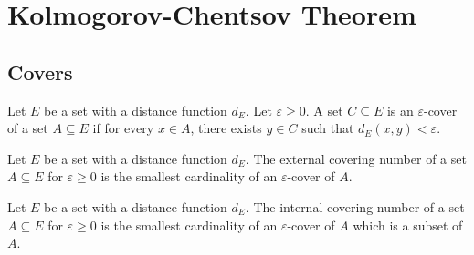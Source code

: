 \chapter{Kolmogorov-Chentsov Theorem}
\label{chap:kolmogorov_chentsov}

\section{Covers}

\begin{definition}\label{def:IsCover}
  \leanok
  Let $E$ be a set with a distance function $d_E$. Let $\varepsilon \ge 0$.
  A set $C \subseteq E$ is an $\varepsilon$-cover of a set $A \subseteq E$ if for every $x \in A$, there exists $y \in C$ such that $d_E(x, y) < \varepsilon$.
\end{definition}

\begin{definition}\label{def:externalCoveringNumber}
  \leanok
  Let $E$ be a set with a distance function $d_E$.
  The external covering number of a set $A \subseteq E$ for $\varepsilon \ge 0$ is the smallest cardinality of an $\varepsilon$-cover of $A$.
\end{definition}

\begin{definition}\label{def:internalCoveringNumber}
  \leanok
  Let $E$ be a set with a distance function $d_E$.
  The internal covering number of a set $A \subseteq E$ for $\varepsilon \ge 0$ is the smallest cardinality of an $\varepsilon$-cover of $A$ which is a subset of $A$.
\end{definition}
